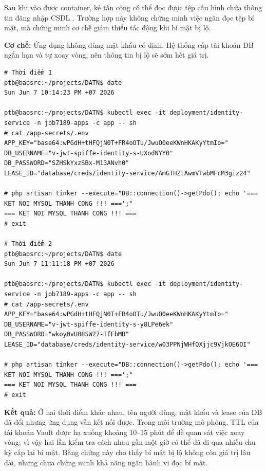 Sau khi vào được container, kẻ tấn công có thể đọc được tệp cấu hình chứa thông tin đăng nhập CSDL \parencite{mitre_t1552}. Trường hợp này không chứng minh việc ngăn đọc tệp bí mật, mà chứng minh cơ chế giảm thiểu tác động khi bí mật bị lộ.

\textbf{Cơ chế:} Ứng dụng không dùng mật khẩu cố định. Hệ thống cấp tài khoản DB ngắn hạn và tự xoay vòng, nên thông tin bị lộ sẽ sớm hết giá trị.

\begin{listing}[H]
\begin{verbatim}
# Thời điểm 1
ptb@baosrc:~/projects/DATN$ date
Sun Jun 7 10:14:23 PM +07 2026

ptb@baosrc:~/projects/DATN$ kubectl exec -it deployment/identity-service -n job7189-apps -c app -- sh
# cat /app-secrets/.env
APP_KEY="base64:wPGdH+tHFQjN0T+FR4oOTu/JwuO0eeKWnHKAKyYtmIo="
DB_USERNAME="v-jwt-spiffe-identity-s-UXodNYY0"
DB_PASSWORD="SZHSkYxzSBx-M13ANvh0"
LEASE_ID="database/creds/identity-service/AmGTHZtAwmVTwbMFcM3giz24"

# php artisan tinker --execute="DB::connection()->getPdo(); echo '=== KET NOI MYSQL THANH CONG !!! ===';"
=== KET NOI MYSQL THANH CONG !!! ===
# exit

# Thời điểm 2
ptb@baosrc:~/projects/DATN$ date
Sun Jun 7 11:11:18 PM +07 2026

ptb@baosrc:~/projects/DATN$ kubectl exec -it deployment/identity-service -n job7189-apps -c app -- sh
# cat /app-secrets/.env
APP_KEY="base64:wPGdH+tHFQjN0T+FR4oOTu/JwuO0eeKWnHKAKyYtmIo="
DB_USERNAME="v-jwt-spiffe-identity-s-y8LPe6ek"
DB_PASSWORD="wkoy0vU08SW27-IfFbMB"
LEASE_ID="database/creds/identity-service/w03PPNjWHfQXjjc9VjkOE6OI"

# php artisan tinker --execute="DB::connection()->getPdo(); echo '=== KET NOI MYSQL THANH CONG !!! ===';"
=== KET NOI MYSQL THANH CONG !!! ===
# exit
\end{verbatim}
\caption{Bằng chứng xoay vòng thông tin kết nối CSDL}
\label{lst:c3_kb7}
\end{listing}

\textbf{Kết quả:} Ở hai thời điểm khác nhau, tên người dùng, mật khẩu và lease của DB đã đổi nhưng ứng dụng vẫn kết nối được. Trong môi trường mô phỏng, TTL của tài khoản Vault được hạ xuống khoảng 10--15 phút để dễ quan sát việc xoay vòng; vì vậy hai lần kiểm tra cách nhau gần một giờ có thể đã đi qua nhiều chu kỳ cấp lại bí mật. Bằng chứng này cho thấy bí mật bị lộ không còn giá trị lâu dài, nhưng chưa chứng minh khả năng ngăn hành vi đọc bí mật.

